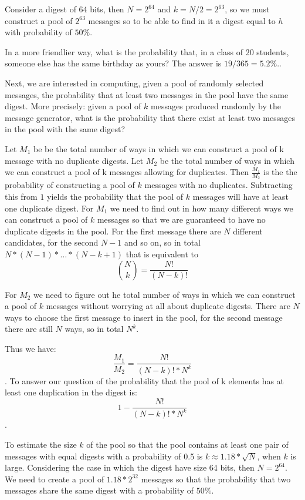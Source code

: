 Consider a digest of 64 bits, then $N = 2^{64}$ and $k = N / 2 = 2^{63}$, so we must construct a pool of $2^{63}$ messages so to be able to find in it a digest equal to $h$ with probability of $50\%$.

In a more friendlier way, what is the probability that, in a class of 20 students, someone else has the same birthday as yours? The answer is $19/365 = 5.2\%$..

Next, we are interested in computing, given a pool of randomly selected messages, the probability that at least two messages in the pool have the same digest. More precisely: given a pool of $k$ messages produced randomly by the message generator, what is the probability that there exist at least two messages in the pool with the same digest?

Let $M_1$ be be the total number of ways in which we can construct a pool of k message with no duplicate digests. Let $M_2$ be the total number of ways in which we can construct a pool of k messages allowing for duplicates. Then $\frac{M_1}{M_2}$ is the the probability of constructing a pool of $k$ messages with no duplicates. Subtracting this from $1$ yields the probability that the pool of $k$ messages will have at least one duplicate digest.
For $M_1$ we need to find out in how many different ways we can construct a pool of $k$ messages so that we are guaranteed to have no duplicate digests in the pool. For the first message there are $N$ different candidates, for the second $N-1$ and so on, so in total $N * (N-1) * \ldots * (N-k+1)$ that is equivalent to \[\binom{N}{k} = \frac{N!}{(N-k)!}\]

For $M_2$ we need to figure out he total number of ways in which we can construct a pool of $k$ messages without worrying at all about duplicate digests. There are $N$ ways to choose the first message to insert in the pool, for the second message there are still $N$ ways, so in total $N^k$.

Thus we have: \[\frac{M_1}{M_2} = \frac{N!}{(N-k)! * N^k} \].
To answer our question of the probability that the pool of k elements has at least one duplication in the digest is: \[1 -  \frac{N!}{(N-k)! * N^k} \].

To estimate the size $k$ of the pool so that the pool contains at least one pair of messages with equal digests with a probability of 0.5 is $k \approx 1.18 * \sqrt{N}$, when $k$ is large.
Considering the case in which the digest have size 64 bits, then $N = 2^{64}$. We need to create a pool of $1.18*2^{32}$ messages so that the probability that two messages share the same digest with a probability of $50\%$.

